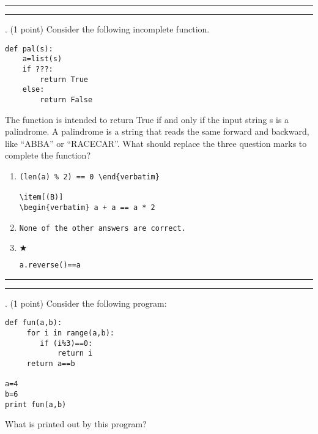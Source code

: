 \documentclass{article}
\newcounter{question}
\begin{document}
\vspace*{2em}
\hrule
\vspace{2em}

\vspace{2em}
\hrule height 2pt


\newpage
{}. (1 point)
Consider the following incomplete function.
\begin{verbatim}
def pal(s):
    a=list(s)
    if ???:
        return True
    else:
        return False
\end{verbatim}
The function is intended to return True if and only if the input string s is a palindrome. A palindrome is a string that reads the same forward and backward, like ``ABBA'' or ``RACECAR''. What should replace the three question marks to complete the function?


\begin{enumerate}
\item[(A)]
\begin{verbatim}(len(a) % 2) == 0 \end{verbatim}

\item[(B)]
\begin{verbatim} a + a == a * 2 \end{verbatim}

\item[(C)]
\begin{verbatim}None of the other answers are correct. \end{verbatim}

\item[(D)] $\bigstar$ 
\begin{verbatim}a.reverse()==a \end{verbatim}

\end{enumerate}

\vspace*{2em}
\hrule
\vspace{2em}

\vspace{2em}
\hrule height 2pt


\newpage
{}. (1 point)
Consider the following program:
\begin{verbatim}
def fun(a,b):
     for i in range(a,b):
        if (i%3)==0:
            return i
     return a==b

a=4
b=6
print fun(a,b)
\end{verbatim}
What is printed out by this program?
\end{document}
